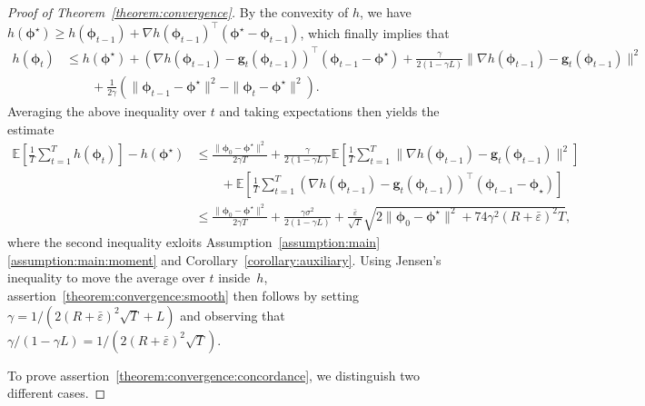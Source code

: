 \documentclass[11pt, a4paper, oneside, reqno]{article}
\begin{document}
\begin{proof} [Proof of Theorem~\ref{theorem:convergence}]
		By the convexity of $h$, we have $h(\bm \phi^\star) \geq h(\bm \phi_{t-1}) + \nabla h(\bm \phi_{t-1})^\top (\bm \phi^\star - \bm \phi_{t-1})$, which finally implies that
		\begin{align*}
		h(\bm \phi_{t})
		&\leq h(\bm \phi^\star) + \left( \nabla h(\bm \phi_{t-1}) - \bm g_t(\bm \phi_{t-1}) \right)^\top ( \bm \phi_{t-1} - \bm \phi^\star) + \frac{\gamma}{2(1 - \gamma L)} \| \nabla h(\bm \phi_{t-1}) - \bm g_t(\bm \phi_{t-1}) \|^2 \\
		& \qquad + \frac{1}{2\gamma} \left( \| \bm \phi_{t-1} - \bm \phi^\star \|^2 - \| \bm \phi_{t} - \bm \phi^\star \|^2 \right). 
		\end{align*}
		Averaging the above inequality over $t$ and taking expectations then yields the estimate
		\begin{align*}
		\mathbb E \left[ \frac{1}{T} \sum_{t=1}^T h(\bm \phi_{t}) \right] - h(\bm \phi^\star)
		&\leq \frac{\| \bm \phi_0 - \bm \phi^\star \|^2}{2\gamma T} + \frac{\gamma}{2 (1 - \gamma L)} \mathbb E \left[ \frac{1}{T} \sum_{t=1}^T \| \nabla h(\bm \phi_{t-1}) - \bm g_t(\bm \phi_{t-1}) \|^2 \right] \\
		&\qquad + \mathbb E \left[ \frac{1}{T} \sum_{t=1}^T \left( \nabla h(\bm \phi_{t-1}) - \bm g_t(\bm \phi_{t-1}) \right)^\top (\bm \phi_{t-1} - \bm \phi_{\star}) \right] \\
		&\leq \frac{\| \bm \phi_0 - \bm \phi^\star \|^2}{2\gamma T} + \frac{\gamma \sigma^2}{2 (1 - \gamma L)} + \frac{\bar \varepsilon}{\sqrt{T}} \sqrt{2 \| \bm \phi_0 - \bm \phi^\star \|^2 + 74 \gamma^2 (R + \bar \varepsilon)^2 T},
		\end{align*}
		where the second inequality exloits Assumption~\ref{assumption:main}\,\ref{assumption:main:moment} and Corollary~\ref{corollary:auxiliary}. Using Jensen's inequality to move the average over $t$ inside~$h$, assertion~\ref{theorem:convergence:smooth} then follows by setting $\gamma = 1 / (2 (R + \bar \varepsilon)^2 \sqrt{T} + L)$ and observing that $\gamma / ( 1 - \gamma L) = 1 / ( 2(R+\bar \varepsilon)^2 \sqrt{T} )$.

		To prove assertion~\ref{theorem:convergence:concordance}, we distinguish two different cases.
		

\end{proof}
\end{document}
